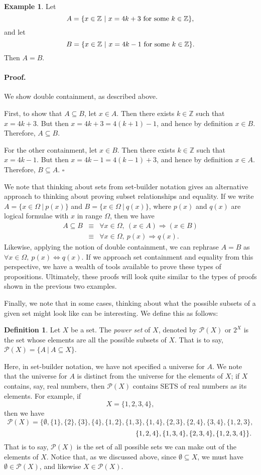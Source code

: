 \documentclass{article}
\theoremstyle{definition}
\newtheorem{example}{Example}
\newtheorem{definition}{Definition}
\renewenvironment{proof} {\paragraph{Proof.}}{\hfill$\square$}
\newcommand{\mc}{\mathcal}
\newcommand{\ra}{\Rightarrow}
\renewcommand{\iff}{\Leftrightarrow}
\newcommand{\Z}{\mathbb{Z}}
\newcommand{\ex}[1]{\begin{examplebox}\begin{example} #1 \end{example}\end{examplebox}}
\begin{document}
\ex{ Let \[A=\{x\in \Z\ | \ x=4k+3\hbox{ for some }k\in \Z\},\] and let \[B=\{x\in\Z\ | \ x=4k-1\hbox{ for some }k\in \Z\}.\] Then $A=B$.

\begin{proof}
We show double containment, as described above.

First, to show that $A\subseteq B$, let $x\in A$. Then there exists $k\in\Z$ such that $x=4k+3$. But then $x=4k+3=4(k+1)-1$, and hence by definition $x\in B$. Therefore, $A\subseteq B$.

For the other containment, let $x\in B$. Then there exists $k\in\Z$ such that $x=4k-1$. But then $x=4k-1=4(k-1)+3$, and hence by definition $x\in A$. Therefore, $B\subseteq A$.
\end{proof}
}

We note that thinking about sets from set-builder notation gives an alternative approach to thinking about proving subset relationships and equality. If we write $A=\{x\in \Omega\ | \ p(x)\}$ and $B=\{x\in\Omega\ | \ q(x)\}$, where $p(x)$ and $q(x)$ are logical formulae with $x$ in range $\Omega$, then we have \begin{eqnarray*}A \subseteq B & \equiv & \forall x\in \Omega,\ (x\in A)\ra (x\in B)\\
&\equiv& \forall x\in \Omega,\ p(x)\ra q(x).\end{eqnarray*}
Likewise, applying the notion of double containment, we can rephrase $A=B$ as $\forall x\in\Omega,\ p(x)\iff q(x)$. If we approach set containment and equality from this perspective, we have a wealth of tools available to prove these types of propositions. Ultimately, these proofs will look quite similar to the types of proofs shown in the previous two examples.

Finally, we note that in some cases, thinking about what the possible subsets of a given set might look like can be interesting. We define this as follows:

\begin{definition}
Let $X$ be a set. The {\it power set} of $X$, denoted by $\mc{P}(X)$ or $2^X$ is the set whose elements are all the possible subsets of $X$. That is to say, $\mc{P}(X) = \{ A\ | \ A\subseteq X\}$.
\end{definition}

Here, in set-builder notation, we have not specified a universe for $A$. We note that the universe for $A$ is distinct from the universe for the elements of $X$; if $X$ contains, say, real numbers, then $\mc P(X)$ contains SETS of real numbers as its elements. For example, if 
\[X=\{1, 2, 3, 4\},\]
then we have 
\[\mc P(X) = \{\emptyset, \{1\}, \{2\}, \{3\}, \{4\}, \{1,2\},\{1,3\},\{1,4\},\{2,3\},\{2,4\},\{3,4\},\{1,2,3\},\]\[\hspace{2.5in}\{1,2,4\},\{1,3,4\},\{2,3,4\},\{1,2,3,4\}\}.\]
That is to say, $\mc P(X)$ is the set of all possible sets we can make out of the elements of $X$. Notice that, as we discussed above, since $\emptyset \subseteq X$, we must have $\emptyset\in \mc P(X)$, and likewise $X\in \mc P(X)$.
\end{document}

